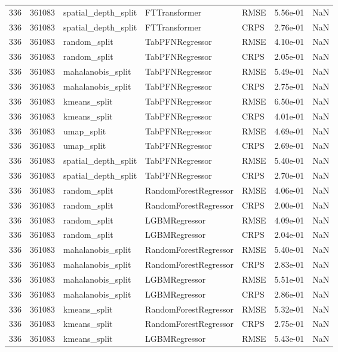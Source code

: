 \begin{tabular}{rrlllrr}
336 & 361083 & spatial\_depth\_split & FTTransformer & RMSE & 5.56e-01 & NaN \\
336 & 361083 & spatial\_depth\_split & FTTransformer & CRPS & 2.76e-01 & NaN \\
336 & 361083 & random\_split & TabPFNRegressor & RMSE & 4.10e-01 & NaN \\
336 & 361083 & random\_split & TabPFNRegressor & CRPS & 2.05e-01 & NaN \\
336 & 361083 & mahalanobis\_split & TabPFNRegressor & RMSE & 5.49e-01 & NaN \\
336 & 361083 & mahalanobis\_split & TabPFNRegressor & CRPS & 2.75e-01 & NaN \\
336 & 361083 & kmeans\_split & TabPFNRegressor & RMSE & 6.50e-01 & NaN \\
336 & 361083 & kmeans\_split & TabPFNRegressor & CRPS & 4.01e-01 & NaN \\
336 & 361083 & umap\_split & TabPFNRegressor & RMSE & 4.69e-01 & NaN \\
336 & 361083 & umap\_split & TabPFNRegressor & CRPS & 2.69e-01 & NaN \\
336 & 361083 & spatial\_depth\_split & TabPFNRegressor & RMSE & 5.40e-01 & NaN \\
336 & 361083 & spatial\_depth\_split & TabPFNRegressor & CRPS & 2.70e-01 & NaN \\
336 & 361083 & random\_split & RandomForestRegressor & RMSE & 4.06e-01 & NaN \\
336 & 361083 & random\_split & RandomForestRegressor & CRPS & 2.00e-01 & NaN \\
336 & 361083 & random\_split & LGBMRegressor & RMSE & 4.09e-01 & NaN \\
336 & 361083 & random\_split & LGBMRegressor & CRPS & 2.04e-01 & NaN \\
336 & 361083 & mahalanobis\_split & RandomForestRegressor & RMSE & 5.40e-01 & NaN \\
336 & 361083 & mahalanobis\_split & RandomForestRegressor & CRPS & 2.83e-01 & NaN \\
336 & 361083 & mahalanobis\_split & LGBMRegressor & RMSE & 5.51e-01 & NaN \\
336 & 361083 & mahalanobis\_split & LGBMRegressor & CRPS & 2.86e-01 & NaN \\
336 & 361083 & kmeans\_split & RandomForestRegressor & RMSE & 5.32e-01 & NaN \\
336 & 361083 & kmeans\_split & RandomForestRegressor & CRPS & 2.75e-01 & NaN \\
336 & 361083 & kmeans\_split & LGBMRegressor & RMSE & 5.43e-01 & NaN \\

\end{tabular}
